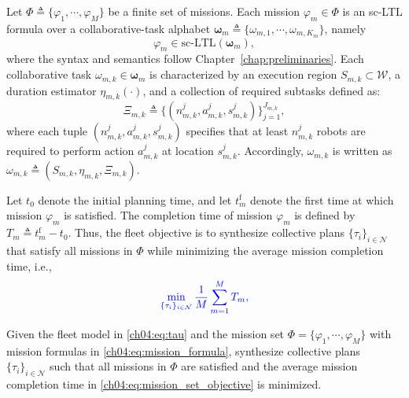 Let $\Phi \triangleq \{\varphi_1,\cdots,\varphi_M\}$ be a finite set of
missions. Each mission $\varphi_m\in\Phi$ is an sc-LTL formula over a
collaborative-task alphabet
$\boldsymbol{\omega}_m \triangleq
\{\omega_{m,1},\cdots,\omega_{m,K_m}\}$, namely
\begin{equation}
\label{ch04:eq:mission_formula}
\varphi_m \in \mathrm{sc\mbox{-}LTL}(\boldsymbol{\omega}_m),
\end{equation}
where the syntax and semantics follow
Chapter~\ref{chap:preliminaries}. Each collaborative task
$\omega_{m,k}\in\boldsymbol{\omega}_m$ is characterized by an execution region
$S_{m,k}\subset\mathcal{W}$, a duration estimator
$\eta_{m,k}(\cdot)$, and a collection of required subtasks defined as:
\[
\Xi_{m,k}\triangleq
\{(n_{m,k}^{j},a_{m,k}^{j},s_{m,k}^{j})\}_{j=1}^{J_{m,k}},
\]
where each tuple $(n_{m,k}^{j},a_{m,k}^{j},s_{m,k}^{j})$ specifies that at
least $n_{m,k}^{j}$ robots are required to perform action
$a_{m,k}^{j}$ at location $s_{m,k}^{j}$. Accordingly,
$\omega_{m,k}$ is written as
$\omega_{m,k}\triangleq(S_{m,k},\eta_{m,k},\Xi_{m,k})$.
 

Let $t_0$ denote the initial planning time, and let $t_m^{\mathrm{f}}$ denote
the first time at which mission $\varphi_m$ is satisfied. The completion time
of mission $\varphi_m$ is defined by
$T_m \triangleq t_m^{\mathrm{f}}-t_0$.
Thus, the fleet objective is to synthesize collective plans
$\{\tau_i\}_{i\in\mathcal{N}}$ that satisfy all missions in $\Phi$ while
minimizing the average mission completion time, i.e.,
\begin{equation}
\color{blue}
\label{ch04:eq:mission_set_objective}
\min_{\{\tau_i\}_{i\in\mathcal{N}}}
\frac{1}{M}\sum_{m=1}^{M} T_m,
\end{equation}

\begin{problem}
\label{ch04:prob:uncertain_mission_set}
Given the fleet model in \eqref{ch04:eq:tau} and the mission set
$\Phi=\{\varphi_1,\cdots,\varphi_M\}$ with mission formulas in
\eqref{ch04:eq:mission_formula}, synthesize collective plans
$\{\tau_i\}_{i\in\mathcal{N}}$ such that all missions in $\Phi$ are satisfied
and the average mission completion time in
\eqref{ch04:eq:mission_set_objective} is minimized.
\end{problem}

